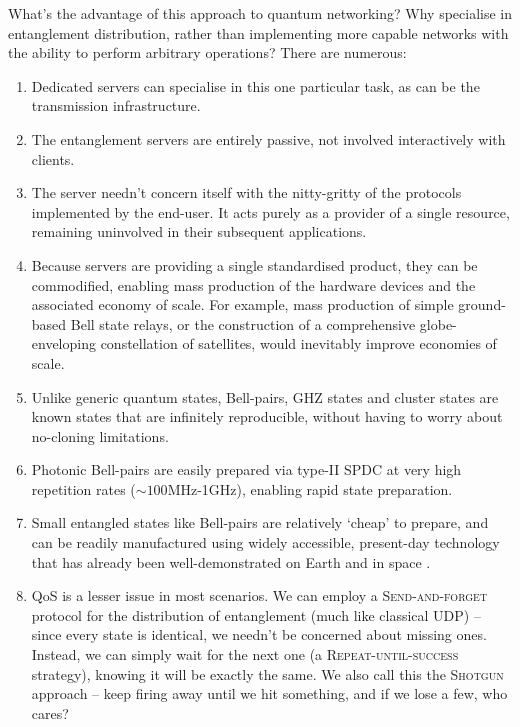 What's the advantage of this approach to quantum networking? Why specialise in entanglement distribution, rather than implementing more capable networks with the ability to perform arbitrary operations? There are numerous:
\begin{enumerate}
\item Dedicated servers can specialise in this one particular task, as can be the transmission infrastructure.
\item The entanglement servers are entirely passive, not involved interactively with clients.
\item The server needn't concern itself with the nitty-gritty of the protocols implemented by the end-user. It acts purely as a provider of a single resource, remaining uninvolved in their subsequent applications.
\item Because servers are providing a single standardised product, they can be commodified, enabling mass production of the hardware devices and the associated economy of scale. For example, mass production of simple ground-based Bell state relays, or the construction of a comprehensive globe-enveloping constellation of satellites, would inevitably improve economies of scale.
\item Unlike generic quantum states, Bell-pairs, GHZ states and cluster states are known states that are infinitely reproducible, without having to worry about no-cloning limitations.
\item Photonic Bell-pairs are easily prepared via type-II SPDC at very high repetition rates (\mbox{$\sim 100$MHz-1GHz}), enabling rapid state preparation.
\item Small entangled states like Bell-pairs are relatively `cheap' to prepare, and can be readily manufactured using widely accessible, present-day technology that has already been well-demonstrated on Earth and in space \cite{???}.
\item QoS is a lesser issue in most scenarios. We can employ a \textsc{Send-and-forget} protocol for the distribution of entanglement (much like classical UDP) -- since every state is identical, we needn't be concerned about missing ones. Instead, we can simply wait for the next one (a \textsc{Repeat-until-success} strategy), knowing it will be exactly the same. We also call this the \textsc{Shotgun} approach -- keep firing away until we hit something, and if we lose a few, who cares?

\end{enumerate}
